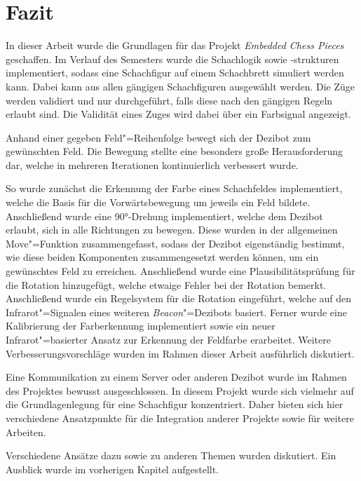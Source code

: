 
\section{Fazit}
\label{sec:conclusion}

In dieser Arbeit wurde die Grundlagen für das Projekt \emph{Embedded Chess Pieces} geschaffen. Im Verlauf des Semesters wurde die Schachlogik sowie -strukturen implementiert, sodass eine Schachfigur auf einem Schachbrett simuliert werden kann. Dabei kann aus allen gängigen Schachfiguren ausgewählt werden. Die Züge werden validiert und nur durchgeführt, falls diese nach den gängigen Regeln~\cite{justUSChessFederations2019} erlaubt sind. Die Validität eines Zuges wird dabei über ein Farbsignal angezeigt.

Anhand einer gegeben Feld"=Reihenfolge bewegt sich der Dezibot zum gewünschten Feld. Die Bewegung stellte eine besonders große Herausforderung dar, welche in mehreren Iterationen kontinuierlich verbessert wurde.

So wurde zunächst die Erkennung der Farbe eines Schachfeldes implementiert, welche die Basis für die Vorwärtsbewegung um jeweils ein Feld bildete. Anschließend wurde eine 90°-Drehung implementiert, welche dem Dezibot erlaubt, sich in alle Richtungen zu bewegen. Diese wurden in der allgemeinen Move"=Funktion zusammengefasst, sodass der Dezibot eigenständig bestimmt, wie diese beiden Komponenten zusammengesetzt werden können, um ein gewünschtes Feld zu erreichen. Anschließend wurde eine Plausibilitätsprüfung für die Rotation hinzugefügt, welche etwaige Fehler bei der Rotation bemerkt. Anschließend wurde ein Regelsystem für die Rotation eingeführt, welche auf den Infrarot"=Signalen eines weiteren \emph{Beacon}"=Dezibots basiert. Ferner wurde eine Kalibrierung der Farberkennung implementiert sowie ein neuer Infrarot"=basierter Ansatz zur Erkennung der Feldfarbe erarbeitet. Weitere Verbesserungsvorschläge wurden im Rahmen dieser Arbeit ausführlich diskutiert.

Eine Kommunikation zu einem Server oder anderen Dezibot wurde im Rahmen des Projektes bewusst ausgeschlossen. In diesem Projekt wurde sich vielmehr auf die Grundlagenlegung für eine Schachfigur konzentriert. Daher bieten sich hier verschiedene Ansatzpunkte für die Integration anderer Projekte sowie für weitere Arbeiten.

Verschiedene Ansätze dazu sowie zu anderen Themen wurden diskutiert. Ein Ausblick wurde im vorherigen Kapitel aufgestellt.


